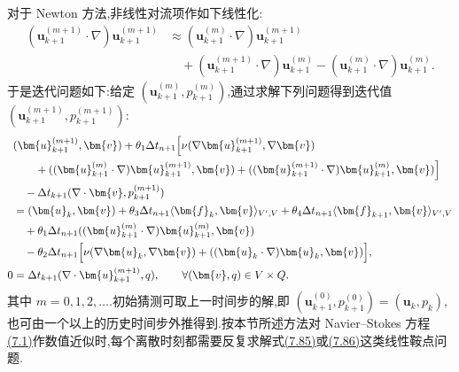 \begin{note}[变分形式的线性化]
对于 Newton 方法,非线性对流项作如下线性化:
\[
\begin{aligned}
  (\bm{u}_{k+1}^{(m+1)}\cdot\nabla)
       \bm{u}_{k+1}^{(m+1)}
  &\approx (\bm{u}_{k+1}^{(m)}\cdot\nabla)
       \bm{u}_{k+1}^{(m+1)}\\
  &\quad+(\bm{u}_{k+1}^{(m+1)}\cdot\nabla)
       \bm{u}_{k+1}^{(m)}
       -(\bm{u}_{k+1}^{(m)}\cdot\nabla)
       \bm{u}_{k+1}^{(m)}.
\end{aligned}
\]
于是迭代问题如下:给定 $(\bm{u}_{k+1}^{(m)},p_{k+1}^{(m)})$,通过求解下列问题得到迭代值 $(\bm{u}_{k+1}^{(m+1)},p_{k+1}^{(m+1)})$:
\begin{equation}\label{eq:general-theta-newton}
\begin{aligned}
  &(\bm{u}_{k+1}^{(m+1)},\bm{v})
   +\theta_1\Delta t_{n+1}\Bigl[
     \nu(\nabla\bm{u}_{k+1}^{(m+1)},\nabla\bm{v})\\
  &\qquad+((\bm{u}_{k+1}^{(m)}\cdot\nabla)
       \bm{u}_{k+1}^{(m+1)},\bm{v})
       +((\bm{u}_{k+1}^{(m+1)}\cdot\nabla)
       \bm{u}_{k+1}^{(m)},\bm{v})\Bigr]\\
  &\quad-\Delta t_{k+1}(\nabla\cdot\bm{v},p_{k+1}^{(m+1)})\\
  &=(\bm{u}_k,\bm{v})
    +\theta_3\Delta t_{n+1}\langle\bm{f}_k,\bm{v}\rangle_{V',V}
    +\theta_4\Delta t_{n+1}\langle\bm{f}_{k+1},\bm{v}\rangle_{V',V}\\
  &\quad+\theta_1\Delta t_{n+1}
       ((\bm{u}_{k+1}^{(m)}\cdot\nabla)
       \bm{u}_{k+1}^{(m)},\bm{v})\\
  &\quad-\theta_2\Delta t_{n+1}\Bigl[
       \nu(\nabla\bm{u}_k,\nabla\bm{v})
       +((\bm{u}_k\cdot\nabla)\bm{u}_k,\bm{v})\Bigr],\\
  0&=\Delta t_{k+1}(\nabla\cdot\bm{u}_{k+1}^{(m+1)},q),
  \qquad \forall (\bm{v},q)\in V\times Q.
\end{aligned}
\end{equation}
其中 $m=0,1,2,\ldots$.初始猜测可取上一时间步的解,即 $(\bm{u}_{k+1}^{(0)},p_{k+1}^{(0)})=(\bm{u}_k,p_k)$,也可由一个以上的历史时间步外推得到.按本节所述方法对 Navier--Stokes 方程\hyperref[eq:time-dependent-ns-strong]{(7.1)}作数值近似时,每个离散时刻都需要反复求解式\hyperref[eq:general-theta-picard]{(7.85)}或\hyperref[eq:general-theta-newton]{(7.86)}这类线性鞍点问题.
\end{note}

